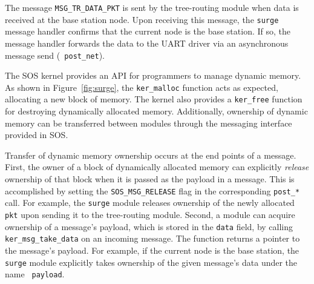 The message {\tt MSG\_TR\_DATA\_PKT} is sent by the tree-routing
module when data is received at the base station node.  Upon receiving
this message, the {\tt surge} message handler confirms that the
current node is the base station.  If so, the message handler forwards
the data to the UART driver via an asynchronous message send ({\tt
post\_net}).

The SOS kernel provides an API for programmers to manage dynamic
memory.  As shown in Figure~\ref{fig:surge}, the {\tt ker\_malloc}
function acts as expected, allocating a new block of memory.  The
kernel also provides a {\tt ker\_free} function for destroying
dynamically allocated memory.  Additionally, ownership of dynamic
memory can be transferred between modules through the messaging
interface provided in SOS.

%
%

Transfer of dynamic memory ownership occurs at the end points of a
message.  First, the owner of a block of dynamically allocated memory
can explicitly {\em release} ownership of that block when it is passed
as the payload in a message.  This is accomplished by setting the
\texttt{SOS\_MSG\_RELEASE} flag in the corresponding {\tt post\_*}
call.  For example, the {\tt surge} module releases ownership of the
newly allocated {\tt pkt} upon sending it to the tree-routing module.
Second, a module can acquire ownership of a message's payload, which
is stored in the {\tt data} field, by calling
\texttt{ker\_msg\_take\_data} on an incoming message.  The function
returns a pointer to the message's payload.  For example, if the
current node is the base station, the {\tt surge} module explicitly
takes ownership of the given message's data under the name {\tt
payload}.

